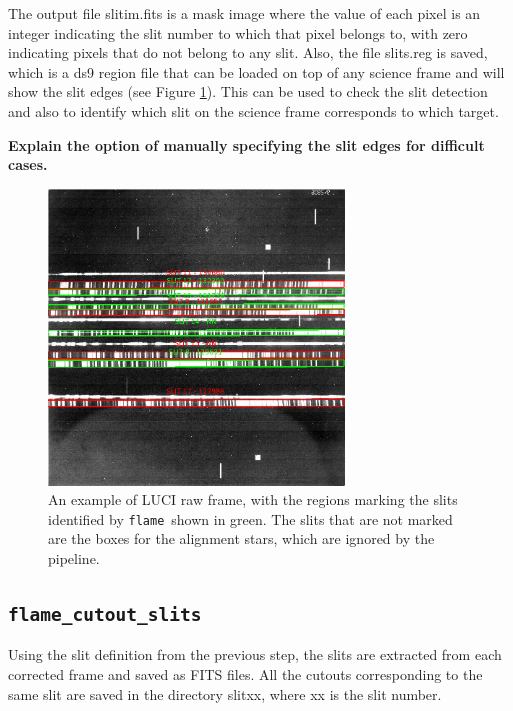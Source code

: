 \documentclass[a4paper, notitlepage]{article}
\newcommand{\flame}{\texttt{flame}}
\begin{document}
The output file slitim.fits is a mask image where the value of each pixel is an integer indicating the slit number to which that pixel belongs to, with zero indicating pixels that do not belong to any slit. Also, the file slits.reg is saved, which is a ds9 region file that can be loaded on top of any science frame and will show the slit edges (see Figure \ref{fig:slits}). This can be used to check the slit detection and also to identify which slit on the science frame corresponds to which target.

\textbf{Explain the option of manually specifying the slit edges for difficult cases.}

\begin{figure}[htbp]
\centering
\includegraphics[width=0.7\textwidth]{slits}
\caption{An example of LUCI raw frame, with the regions marking the slits identified by \flame\ shown in green. The slits that are not marked are the boxes for the alignment stars, which are ignored by the pipeline.}
\label{fig:slits}
\end{figure}


\subsection{\texttt{flame\_cutout\_slits}}

Using the slit definition from the previous step, the slits are extracted from each corrected frame and saved as FITS files. All the cutouts corresponding to the same slit are saved in the directory slitxx, where xx is the slit number.


\end{document}
